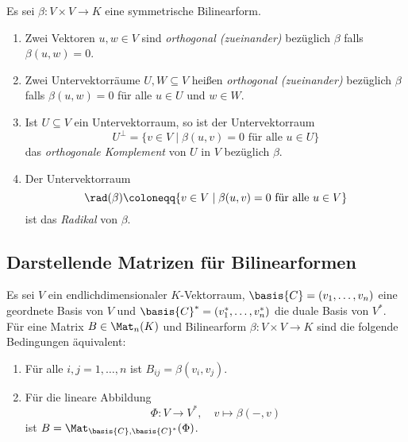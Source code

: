 \begin{definition}
  Es sei $\beta \colon V \times V \to K$ eine symmetrische Bilinearform.
  \begin{enumerate}[leftmargin=*, label=\roman*)]
    \item
      Zwei Vektoren $u, w \in V$ sind \emph{orthogonal (zueinander)} bezüglich $\beta$ falls $\beta(u,w) = 0$.
    \item
      Zwei Untervektorräume $U, W \subseteq V$ heißen \emph{orthogonal (zueinander)} bezüglich $\beta$ falls $\beta(u,w) = 0$ für alle $u \in U$ und $w \in W$.
    \item
      Ist $U \subseteq V$ ein Untervektorraum, so ist der Untervektorraum
      \[
        U^\perp
        =
        \{
          v \in V
          \mid
          \text{$\beta(u,v) = 0$ für alle $u \in U$}
        \}
      \]
      das \emph{orthogonale Komplement} von $U$ in $V$ bezüglich $\beta$.
    \item
      Der Untervektorraum
      \[
        \rad(\beta)
        \coloneqq
        \{v \in V \mid \text{$\beta(u,v) = 0$ für alle $u \in V$}\}
      \]
      ist das \emph{Radikal} von $\beta$.
  \end{enumerate}
\end{definition}












\subsection{Darstellende Matrizen für Bilinearformen}


\begin{lemma}
  Es sei $V$ ein endlichdimensionaler $K$-Vektorraum, $\basis{C} = (v_1, \dotsc, v_n)$ eine geordnete Basis von $V$ und $\basis{C}^* = (v_1^*, \dotsc, v_n^*)$ die duale Basis von $V^*$.
  Für eine Matrix $B \in \Mat_n(K)$ und Bilinearform $\beta \colon V \times V \to K$ sind die folgende Bedingungen äquivalent:
  \begin{enumerate}[leftmargin=*, label=\roman*)]
    \item
      Für alle $i,j = 1, \dotsc, n$ ist $B_{ij} = \beta(v_i, v_j)$.
    \item
      Für die lineare Abbildung
      \[
        \Phi \colon V \to V^*,
        \quad
        v \mapsto \beta(-,v)
      \]
      ist $B = \Mat_{\basis{C}, \basis{C}^*}(\Phi)$.
  \end{enumerate}
\end{lemma}


